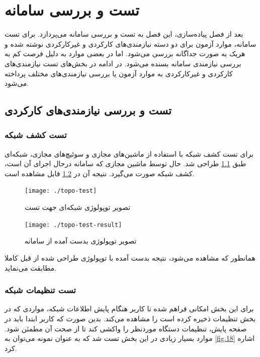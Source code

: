 \chapter{تست و بررسی سامانه}

بعد از فصل پیاده‌سازی، این فصل به تست و بررسی سامانه می‌پردازد. برای تست سامانه، موارد آزمون برای دو دسته نیازمندی‌های کارکردی و غیرکارکردی نوشته شده و هریک به صورت جداگانه بررسی می‌شود. اما در بعضی موارد به دلیل فرصت کم به بررسی نیازمندی‌ سامانه بسنده می‌شود. در ادامه در بخش‌های تست نیازمندی‌های کارکردی و غیرکارکردی به موارد آزمون یا بررسی نیازمندی‌های مختلف پرداخته می‌شود.

\section{تست و بررسی نیازمندی‌های کارکردی}

\subsection{تست کشف شبکه}
برای تست کشف شبکه با استفاده از ماشین‌های مجازی و سوئیچ‌های مجازی، شبکه‌ای طبق \cref{fig.51} طراحی شد. حال توسط ماشین مجازی که سامانه درحال اجرای آن است، کشف شبکه صورت می‌گیرد. نتیجه آن در \cref{fig.52} قابل مشاهده است.


\begin{figure}[!h]
    \centering\texttt{[image: ./topo-test]}
    \caption{تصویر توپولوژی شبکه‌ای جهت تست}\label{fig.51}
\end{figure}


\begin{figure}[!h]
    \centering\texttt{[image: ./topo-test-result]}
    \caption{تصویر توپولوژی بدست آمده از سامانه}\label{fig.52}
\end{figure}




\cleardoublepage

همانطور که مشاهده می‌شود، نتیجه بدست آمده با توپولوژی طراحی شده از قبل کاملا مطابقت می‌نماید.

\subsection{تست تنظیمات شبکه}

برای این بخش امکانی فراهم شده تا کاربر هنگام پایش اطلاعات شبکه، مواردی که در بخش تنظیمات ذخیره کرده است را مشاهده می‌کند. بدین صورت که کاربر ابتدا باید در صفحه پایش، تنظیمات دستگاه موردنظر را واکشی کند تا از صحت آن مطمئن شود. موارد بسیار زیادی در این بخش تست شد که به عنوان نمونه می‌توان به \cref{fig.18} اشاره کرد.


